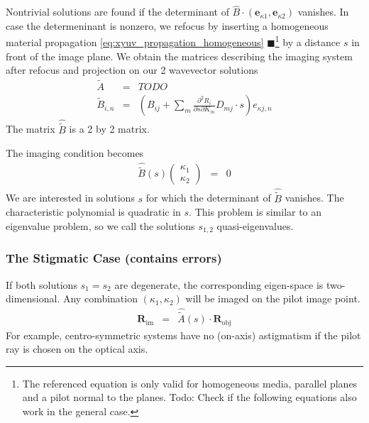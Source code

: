\documentclass[12pt,a4paper,twoside,openright,BCOR10mm,headsepline,titlepage,abstracton,chapterprefix,final]{scrreprt}
\newcommand\Vector[1]{{\mathbf{#1}}}
\newcommand{\remark}[1]{{\color{red}$\blacksquare$}\footnote{{\color{red}#1}}}
\newcommand\im{\textrm{im}}
\newcommand\obj{\textrm{obj}}
\begin{document}
Nontrivial solutions are found if the determinant of $\hat{B} \cdot(\Vector{e}_{\kappa1}, \Vector{e}_{\kappa2})$ vanishes.
In case the determeninant is nonzero, 
we refocus by inserting a homogeneous material propagation \eqref{eq:xyuv_propagation_homogeneous} 
\remark{The referenced equation is only valid for homogeneous media, parallel planes and a pilot normal to the planes. Todo: Check if the following equations also work in the general case.} 
by a distance $s$ 
in front of the image plane.
We obtain the matrices describing the imaging system after refocus and projection on our 2 wavevector solutions
\begin{eqnarray}
 \tilde{A} &=& TODO \\
 \tilde{B}_{i,n} &=& \left( B_{ij} + \sum_m \frac{\partial^2 R_i}{\partial s \partial K_m} D_{mj} \cdot s \right) e_{\kappa j,n} \label{eq:tildeB}
\end{eqnarray}
The matrix $\hat{\tilde{B}}$ is a 2 by 2 matrix.

The imaging condition becomes
\begin{eqnarray}
 \hat{\tilde{B}}(s) \begin{pmatrix} \kappa_1 \\ \kappa_2 \end{pmatrix} &=& 0
\end{eqnarray}
We are interested in solutions $s$ for which the determinant of $\hat{\tilde{B}}$ vanishes.
The characteristic polynomial is quadratic in $s$.
This problem is similar to an eigenvalue problem, so we call the solutions $s_{1,2}$ quasi-eigenvalues.

\subsubsection{The Stigmatic Case (contains errors)}
If both solutions $s_1 = s_2$ are degenerate, the corresponding eigen-space is two-dimensional.
Any combination $(\kappa_1, \kappa_2)$ will be imaged on the pilot image point.
\begin{eqnarray}
 \Vector{R}_\im &=& \hat{\tilde{A}}(s) \cdot \Vector{R}_\obj
\end{eqnarray}
For example, centro-symmetric systems have no (on-axis) astigmatism if the pilot ray is chosen on the optical axis.
\end{document}
